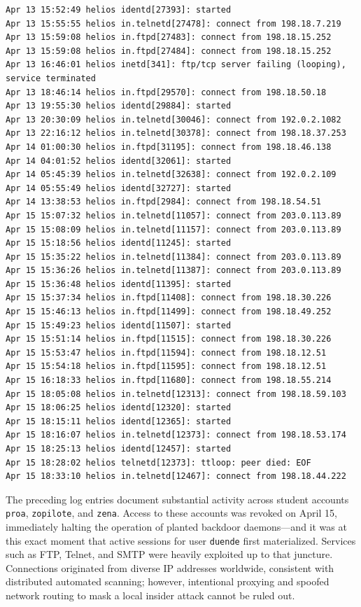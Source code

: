 \begin{lstlisting}[style=terminal]
Apr 13 15:52:49 helios identd[27393]: started
Apr 13 15:55:55 helios in.telnetd[27478]: connect from 198.18.7.219
Apr 13 15:59:08 helios in.ftpd[27483]: connect from 198.18.15.252
Apr 13 15:59:08 helios in.ftpd[27484]: connect from 198.18.15.252
Apr 13 16:46:01 helios inetd[341]: ftp/tcp server failing (looping), service terminated
Apr 13 18:46:14 helios in.ftpd[29570]: connect from 198.18.50.18
Apr 13 19:55:30 helios identd[29884]: started
Apr 13 20:30:09 helios in.telnetd[30046]: connect from 192.0.2.1082
Apr 13 22:16:12 helios in.telnetd[30378]: connect from 198.18.37.253
Apr 14 01:00:30 helios in.ftpd[31195]: connect from 198.18.46.138
Apr 14 04:01:52 helios identd[32061]: started
Apr 14 05:45:39 helios in.telnetd[32638]: connect from 192.0.2.109
Apr 14 05:55:49 helios identd[32727]: started
Apr 14 13:38:53 helios in.ftpd[2984]: connect from 198.18.54.51
Apr 15 15:07:32 helios in.telnetd[11057]: connect from 203.0.113.89
Apr 15 15:08:09 helios in.telnetd[11157]: connect from 203.0.113.89
Apr 15 15:18:56 helios identd[11245]: started
Apr 15 15:35:22 helios in.telnetd[11384]: connect from 203.0.113.89
Apr 15 15:36:26 helios in.telnetd[11387]: connect from 203.0.113.89
Apr 15 15:36:48 helios identd[11395]: started
Apr 15 15:37:34 helios in.ftpd[11408]: connect from 198.18.30.226
Apr 15 15:46:13 helios in.ftpd[11499]: connect from 198.18.49.252
Apr 15 15:49:23 helios identd[11507]: started
Apr 15 15:51:14 helios in.ftpd[11515]: connect from 198.18.30.226
Apr 15 15:53:47 helios in.ftpd[11594]: connect from 198.18.12.51
Apr 15 15:54:18 helios in.ftpd[11595]: connect from 198.18.12.51
Apr 15 16:18:33 helios in.ftpd[11680]: connect from 198.18.55.214
Apr 15 18:05:08 helios in.telnetd[12313]: connect from 198.18.59.103
Apr 15 18:06:25 helios identd[12320]: started
Apr 15 18:15:11 helios identd[12365]: started
Apr 15 18:16:07 helios in.telnetd[12373]: connect from 198.18.53.174
Apr 15 18:25:13 helios identd[12457]: started
Apr 15 18:28:02 helios telnetd[12373]: ttloop: peer died: EOF
Apr 15 18:33:10 helios in.telnetd[12467]: connect from 198.18.44.222
\end{lstlisting}

\vspace{1em}

The preceding log entries document substantial activity across student accounts \texttt{proa}, \texttt{zopilote}, and \texttt{zena}. Access to these accounts was revoked on April 15, immediately halting the operation of planted backdoor daemons---and it was at this exact moment that active sessions for user \texttt{duende} first materialized. Services such as FTP, Telnet, and SMTP were heavily exploited up to that juncture. Connections originated from diverse IP addresses worldwide, consistent with distributed automated scanning; however, intentional proxying and spoofed network routing to mask a local insider attack cannot be ruled out.

